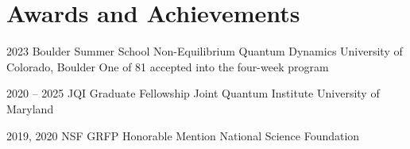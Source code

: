 \section{Awards and Achievements}


\cventry
  {2023}
  {Boulder Summer School}
  {Non-Equilibrium Quantum Dynamics}
  {University of Colorado, Boulder}
  {}
  {One of 81 accepted into the four-week program}



\cventry
  {2020 -- 2025}
  {JQI Graduate Fellowship}
  {}
  {Joint Quantum Institute}
  {University of Maryland}
  {}


\cventry
  {2019, 2020}
  {NSF GRFP Honorable Mention}
  {}
  {National Science Foundation}
  {}
  {}





